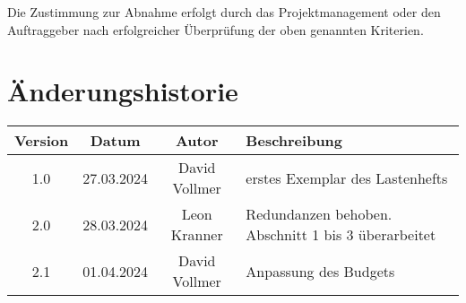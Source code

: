 \documentclass{article}
\begin{document}
Die Zustimmung zur Abnahme erfolgt durch das Projektmanagement oder den Auftraggeber nach erfolgreicher Überprüfung der oben genannten Kriterien.


\section{Änderungshistorie}
\begin{tabular}{|c|c|c|l|}
    \hline
    Version & Datum & Autor & Beschreibung \\
    \hline
    1.0 & 27.03.2024 & David Vollmer & erstes Exemplar des Lastenhefts \\
    \hline
    2.0 & 28.03.2024 & Leon Kranner & Redundanzen behoben. Abschnitt 1 bis 3 überarbeitet \\
    \hline
    2.1 & 01.04.2024 & David Vollmer & Anpassung des Budgets \\
    \hline
\end{tabular}
\end{document}
